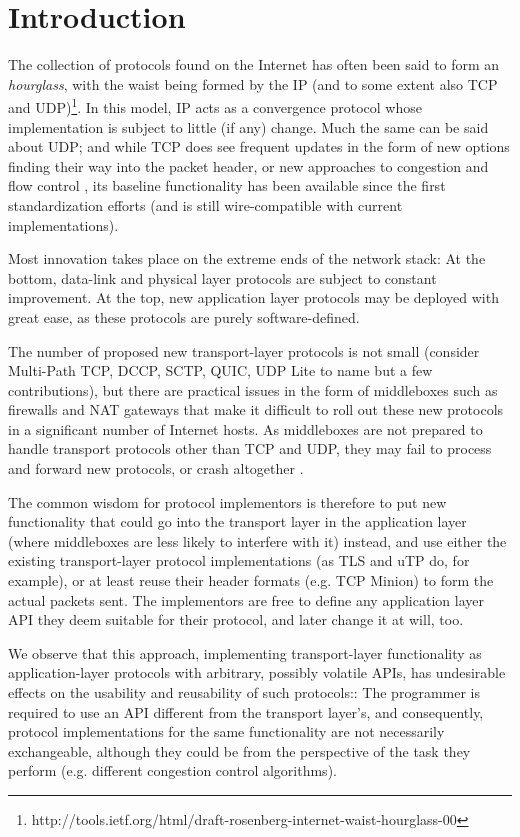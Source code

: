 \section{Introduction}

The collection of protocols found on the Internet has often been said to form an \textit{hourglass}, with the waist being formed by the \ac{IP} (and to some extent also \ac{TCP} and \ac{UDP})\footnote{http://tools.ietf.org/html/draft-rosenberg-internet-waist-hourglass-00}. In this model, \ac{IP} acts as a convergence protocol whose implementation is subject to little (if any) change. Much the same can be said about \ac{UDP}; and while \ac{TCP} does see frequent updates in the form of new options finding their way into the packet header, or new approaches to congestion and flow control \cite{IW10,cubic,more-tcp-cong-ctrl-refs}, its baseline functionality has been available since the first standardization efforts \cite{rfc793} (and is still wire-compatible with current implementations).

Most innovation takes place on the extreme ends of the network stack: At the bottom, data-link and physical layer protocols are subject to constant improvement. At the top, new application layer protocols may be deployed with great ease, as these protocols are purely software-defined.

The number of proposed new transport-layer protocols is not small (consider Multi-Path TCP, DCCP, SCTP, QUIC, UDP Lite to name but a few contributions), but there are practical issues in the form of middleboxes such as firewalls and \ac{NAT} gateways that make it difficult to roll out these new protocols in a significant number of Internet hosts. As middleboxes are not prepared to handle transport protocols other than TCP and UDP, they may fail to process and forward new protocols, or crash altogether \cite{ECN-survey}.

The common wisdom for protocol implementors is therefore to put new functionality that could go into the transport layer in the application layer (where middleboxes are less likely to interfere with it) instead, and use either the existing transport-layer protocol implementations (as TLS and uTP do, for example), or at least reuse their header formats (e.g. TCP Minion) to form the actual packets sent. The implementors are free to define any application layer \ac{API} they deem suitable for their protocol, and later change it at will, too.

We observe that this approach, implementing transport-layer functionality as application-layer protocols with arbitrary, possibly volatile \acp{API}, has undesirable effects on the usability and reusability of such protocols:: The programmer is required to use an \ac{API} different from the transport layer's, and consequently, protocol implementations for the same functionality are not necessarily exchangeable, although they could be from the perspective of the task they perform (e.g. different congestion control algorithms).

